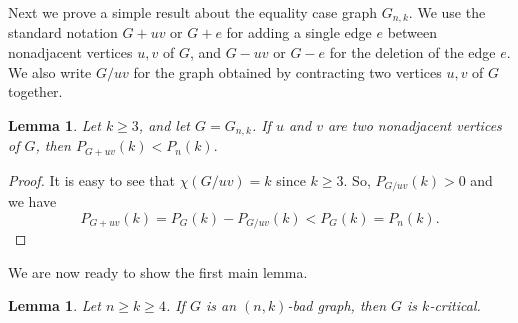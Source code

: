 \documentclass[11pt]{article}
\theoremstyle{plain}
\newtheorem{lemma}[theorem]{Lemma}
\theoremstyle{definition}
\theoremstyle{remark}
\begin{document}
Next we prove a simple result about the equality case graph $G_{n,k}$. We use the standard notation $G + uv$ or $G+e$ for adding a single edge $e$ between nonadjacent vertices $u,v$ of $G$, and $G-uv$ or $G-e$ for the deletion of the edge $e$. We also write $G / uv$ for the graph obtained by contracting two vertices $u,v$ of $G$ together.

\begin{lemma}\label{kclique_ear_sub} Let $k \geq 3$, and let $G= G_{n,k}$. If $u$ and $v$ are two nonadjacent vertices of $G$, then $P_{G+uv}(k)<P_n(k).$
\end{lemma}

\begin{proof}
It is easy to see that $\chi(G/uv)=k$ since $k\geq 3$. So, $P_{G/uv}(k)>0$ and we have 
\[
P_{G+uv}(k)=P_G(k)-P_{G/uv}(k)<P_G(k)=P_n(k).
\]\end{proof}

We are now ready to show the first main lemma.

\begin{lemma}\label{criticalLemma} Let $n\geq k\geq 4$. If $G$ is an $(n,k)$-bad graph, then $G$ is $k$-critical. 
\end{lemma}
\end{document}
